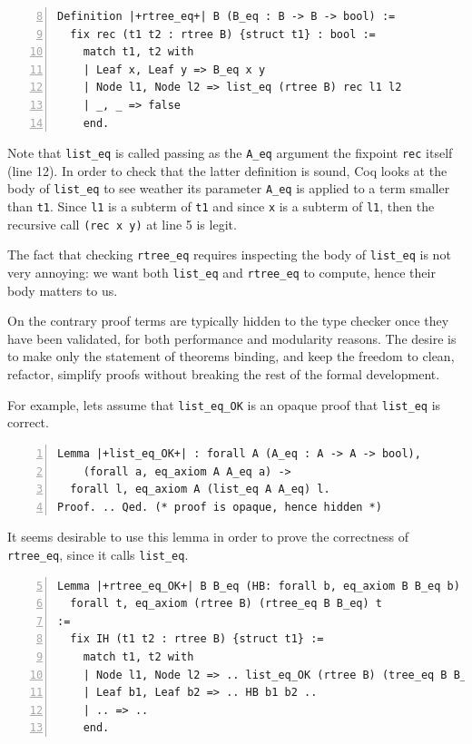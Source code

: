 \documentclass[a4paper,UKenglish,cleveref, autoref]{lipics-v2019}
\begin{document}
\begin{lstlisting}[numbers=left,firstnumber=8]
Definition |+rtree_eq+| B (B_eq : B -> B -> bool) :=
  fix rec (t1 t2 : rtree B) {struct t1} : bool :=
    match t1, t2 with
    | Leaf x, Leaf y => B_eq x y
    | Node l1, Node l2 => list_eq (rtree B) rec l1 l2
    | _, _ => false
    end.
\end{lstlisting}

\noindent
Note that \lstinline+list_eq+ is called passing as the \lstinline+A_eq+
argument the fixpoint \lstinline+rec+ itself (line 12). In order to
check that the latter definition is sound, Coq looks at the body of
\lstinline+list_eq+ to see weather its parameter \lstinline+A_eq+ is
applied to a term smaller than \lstinline+t1+. Since
\lstinline+l1+ is a subterm of \lstinline+t1+ and since \lstinline+x+
is a subterm of \lstinline+l1+, then the recursive call
\lstinline+(rec x y)+ at line 5 is legit.

The fact that checking \lstinline+rtree_eq+ requires
inspecting the body of \lstinline+list_eq+ is not very annoying:
we want both \lstinline+list_eq+
and \lstinline+rtree_eq+ to compute, hence their body matters to us.

On the contrary proof terms are typically hidden to the type checker once
they have been validated, for both performance and modularity reasons.
The desire is to make only the statement of theorems binding, and keep
the freedom to clean, refactor, simplify proofs without breaking
the rest of the formal development. 

For example, lets assume that \lstinline+list_eq_OK+ is an opaque
proof that \lstinline+list_eq+ is correct.

\begin{lstlisting}[numbers=left]
Lemma |+list_eq_OK+| : forall A (A_eq : A -> A -> bool),
    (forall a, eq_axiom A A_eq a) ->
  forall l, eq_axiom A (list_eq A A_eq) l.
Proof. .. Qed. (* proof is opaque, hence hidden *)
\end{lstlisting}

\noindent
It seems desirable to use this lemma in order to prove the
correctness of \lstinline+rtree_eq+, since it calls
\lstinline+list_eq+.

\begin{lstlisting}[numbers=left,firstnumber=5]
Lemma |+rtree_eq_OK+| B B_eq (HB: forall b, eq_axiom B B_eq b) :
  forall t, eq_axiom (rtree B) (rtree_eq B B_eq) t
:= 
  fix IH (t1 t2 : rtree B) {struct t1} :=
    match t1, t2 with
    | Node l1, Node l2 => .. list_eq_OK (rtree B) (tree_eq B B_eq) IH l1 l2 ..
    | Leaf b1, Leaf b2 => .. HB b1 b2 ..
    | .. => ..
    end.
\end{lstlisting}
\end{document}
